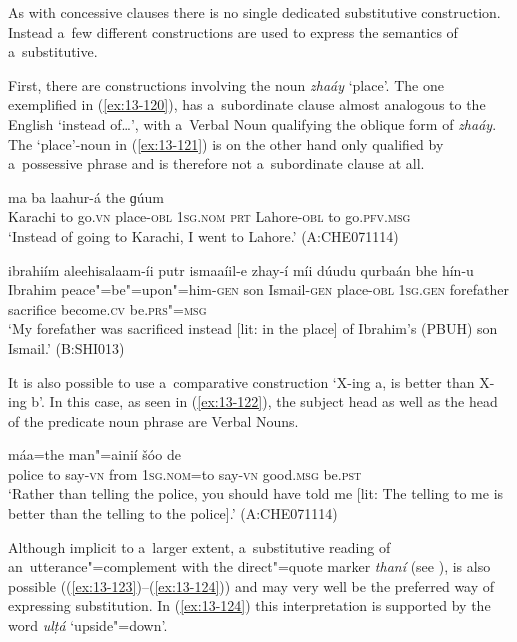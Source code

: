  As with concessive clauses there is no single dedicated substitutive construction. Instead a~few different constructions are used to express the semantics of a~substitutive.


First, there are constructions involving the noun \textit{zhaáy} `place'. The one exemplified in (\ref{ex:13-120}), has a~subordinate clause almost analogous to the English `instead of{\ldots}', with a~Verbal Noun qualifying the oblique form of \textit{zhaáy}. The `place'-noun in (\ref{ex:13-121}) is on the other hand only qualified by a~possessive phrase and is therefore not a~subordinate clause at all. 

\begin{exe}
\ex
\label{ex:13-120}
 ma ba laahur-á  the ɡúum \\
Karachi to go.\textsc{vn} place-\textsc{obl} \textsc{1sg.nom} \textsc{prt} Lahore-\textsc{obl} to go.\textsc{pfv.msg} \\
\glt `Instead of going to Karachi, I went to Lahore.' (A:CHE071114)

\ex
\label{ex:13-121}
\gll ibrahiím aleehisalaam-íi putr ismaaíil-e zhay-í  míi dúudu qurbaán bhe hín-u \\
Ibrahim peace"=be"=upon"=him-\textsc{gen} son Ismail-\textsc{gen} place-\textsc{obl}  \textsc{1sg.gen} forefather sacrifice become.\textsc{cv} be.\textsc{prs"=msg} \\
\glt `My forefather was sacrificed instead [lit: in the place] of Ibrahim's (PBUH) son Ismail.' (B:SHI013) 
\end{exe}

It is also possible to use a~comparative construction `X-ing a, is better than X-ing b'. In this case, as seen in (\ref{ex:13-122}), the subject head as well as the head of the predicate noun phrase are Verbal Nouns.

\begin{exe}
\ex
\label{ex:13-122}
\gll [pulusá the man"=ainií díi] máa=the man"=ainií šóo de \\
police to say-\textsc{vn} from \textsc{1sg.nom=}to say-\textsc{vn} good.\textsc{msg} be.\textsc{pst} \\
\glt `Rather than telling the police, you should have told me [lit: The telling to me is better than the telling to the police].' (A:CHE071114) 
\end{exe}

Although implicit to a~larger extent, a~substitutive reading of an~utterance"=complement with the direct"=quote marker \textit{thaní} (see ), is also possible ((\ref{ex:13-123})--(\ref{ex:13-124})) and may very well be the preferred way of expressing substitution. In (\ref{ex:13-124}) this interpretation is supported by the word \textit{ulṭá} `upside"=down'.

